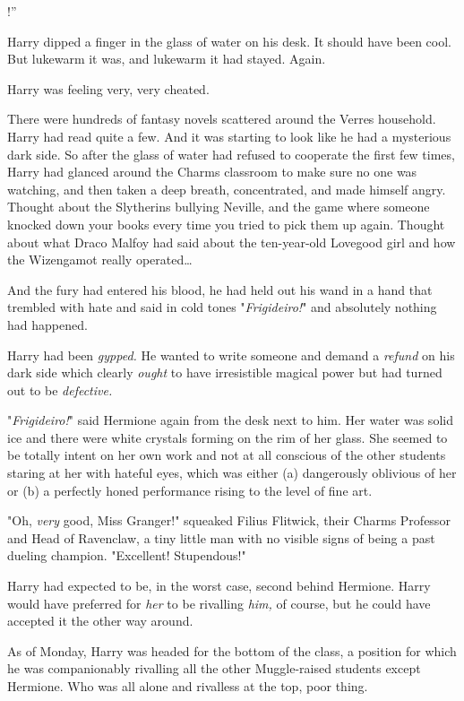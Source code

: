 
!''

\quad\quad
Harry dipped a finger in the glass of water on his desk. It should have been 
cool. But lukewarm it was, and lukewarm it had stayed. Again.

Harry was feeling very, very cheated.

There were hundreds of fantasy novels scattered around the Verres household. 
Harry had read quite a few. And it was starting to look like he had a 
mysterious dark side. So after the glass of water had refused to cooperate the 
first few times, Harry had glanced around the Charms classroom to make sure no 
one was watching, and then taken a deep breath, concentrated, and made himself 
angry. Thought about the Slytherins bullying Neville, and the game where 
someone knocked down your books every time you tried to pick them up again. 
Thought about what Draco Malfoy had said about the ten-year-old Lovegood girl 
and how the Wizengamot really operated{\ldots}

And the fury had entered his blood, he had held out his wand in a hand that 
trembled with hate and said in cold tones "\emph{Frigideiro!}" and absolutely 
nothing had happened.

Harry had been \emph{gypped.} He wanted to write someone and demand a 
\emph{refund} on his dark side which clearly \emph{ought} to have irresistible 
magical power but had turned out to be \emph{defective.}

"\emph{Frigideiro!}" said Hermione again from the desk next to him. Her water 
was solid ice and there were white crystals forming on the rim of her glass. 
She seemed to be totally intent on her own work and not at all conscious of the 
other students staring at her with hateful eyes, which was either (a) 
dangerously oblivious of her or (b) a perfectly honed performance rising to the 
level of fine art.

"Oh, \emph{very} good, Miss Granger!" squeaked Filius Flitwick, their Charms 
Professor and Head of Ravenclaw, a tiny little man with no visible signs of 
being a past dueling champion. "Excellent! Stupendous!"

Harry had expected to be, in the worst case, second behind Hermione. Harry 
would have preferred for \emph{her} to be rivalling \emph{him,} of course, but 
he could have accepted it the other way around.

As of Monday, Harry was headed for the bottom of the class, a position for 
which he was companionably rivalling all the other Muggle-raised students 
except Hermione. Who was all alone and rivalless at the top, poor thing.

